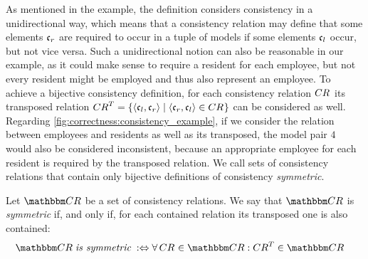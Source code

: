As mentioned in the example, the definition considers consistency in a unidirectional way, which means that a consistency relation may define that some elements $\conditionelement{c}{r}$ are required to occur in a tuple of models if some elements $\conditionelement{c}{l}$ occur, but not vice versa.
Such a unidirectional notion can also be reasonable in our example, as it could make sense to require a resident for each employee, but not every resident might be employed and thus also represent an employee.
To achieve a bijective consistency definition, for each consistency relation $\consistencyrelation{CR}{}$ its transposed relation $\consistencyrelation{CR}{}^T = \setted{\tupled{\conditionelement{c}{l}, \conditionelement{c}{r}} \mid \tupled{\conditionelement{c}{r}, \conditionelement{c}{l}} \in \consistencyrelation{CR}{}}$ can be considered as well.
Regarding \autoref{fig:correctness:consistency_example}, if we consider the relation between employees and residents as well as its transposed, the model pair $4$ would also be considered inconsistent, because an appropriate employee for each resident is required by the transposed relation.
We call sets of consistency relations that contain only bijective definitions of consistency \emph{symmetric}.

\begin{definition}
    Let $\consistencyrelationset{CR}$ be a set of consistency relations.
    We say that $\consistencyrelationset{CR}$ is \emph{symmetric} if, and only if, for each contained relation its transposed one is also contained:
    \begin{align*}
        &
        \consistencyrelationset{CR} \mathtextspacearound{is symmetric} \equivalentperdefinition
        \forall \consistencyrelation{CR}{} \in \consistencyrelationset{CR} :
        \consistencyrelation{CR}{}^T \in \consistencyrelationset{CR}
    \end{align*}
\end{definition}

